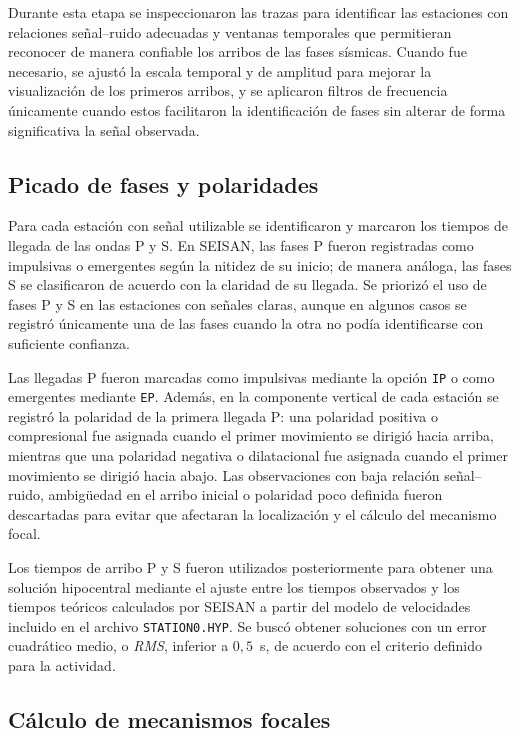 \documentclass[a4paper,12pt]{article} %
\numberwithin{equation}{section} %
\numberwithin{figure}{section} %
\begin{document}
Durante esta etapa se inspeccionaron las trazas para identificar las estaciones con relaciones señal--ruido adecuadas y ventanas temporales que permitieran reconocer de manera confiable los arribos de las fases sísmicas. Cuando fue necesario, se ajustó la escala temporal y de amplitud para mejorar la visualización de los primeros arribos, y se aplicaron filtros de frecuencia únicamente cuando estos facilitaron la identificación de fases sin alterar de forma significativa la señal observada.

\subsection{Picado de fases y polaridades}

Para cada estación con señal utilizable se identificaron y marcaron los tiempos de llegada de las ondas P y S. En SEISAN, las fases P fueron registradas como impulsivas o emergentes según la nitidez de su inicio; de manera análoga, las fases S se clasificaron de acuerdo con la claridad de su llegada. Se priorizó el uso de fases P y S en las estaciones con señales claras, aunque en algunos casos se registró únicamente una de las fases cuando la otra no podía identificarse con suficiente confianza.

Las llegadas P fueron marcadas como impulsivas mediante la opción \texttt{IP} o como emergentes mediante \texttt{EP}. Además, en la componente vertical de cada estación se registró la polaridad de la primera llegada P: una polaridad positiva o compresional fue asignada cuando el primer movimiento se dirigió hacia arriba, mientras que una polaridad negativa o dilatacional fue asignada cuando el primer movimiento se dirigió hacia abajo. Las observaciones con baja relación señal--ruido, ambigüedad en el arribo inicial o polaridad poco definida fueron descartadas para evitar que afectaran la localización y el cálculo del mecanismo focal.

Los tiempos de arribo P y S fueron utilizados posteriormente para obtener una solución hipocentral mediante el ajuste entre los tiempos observados y los tiempos teóricos calculados por SEISAN a partir del modelo de velocidades incluido en el archivo \texttt{STATION0.HYP}. Se buscó obtener soluciones con un error cuadrático medio, o \textit{RMS}, inferior a $0{,}5$~s, de acuerdo con el criterio definido para la actividad.

\subsection{Cálculo de mecanismos focales}
\end{document}
